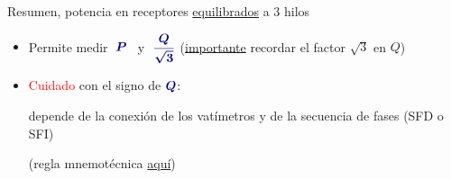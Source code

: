 \documentclass[aspectratio=169, usenames,svgnames,dvipsnames]{beamer}
\begin{document}
\begin{frame}{Resumen, \hspace{3mm}potencia en receptores \underline{equilibrados} a 3 hilos}

    \vspace{3mm}


    \begin{adjustwidth}{0.5cm}{} %
    \begin{itemize}
        \normalsize

        \item Permite medir $\; {\boldsymbol{\color{blue!50!black} P}} \;\,$ y $\; {\boldsymbol{\color{blue!50!black} \dfrac{Q}{\sqrt3}}}$ \hspace{3mm}(\underline{importante} recordar el factor $\sqrt3$ en $Q$)

        \vspace{3mm}
        \item \textcolor{red}{Cuidado} con el \alert{signo} de ${\boldsymbol{\color{blue!50!black} Q}}$\hspace{0.2mm}:

        \vspace{1mm}
        depende de la \alert{conexión} de los vatímetros y de la \alert{secuencia de fases} (SFD o SFI)

        \vspace{1mm}
        (regla mnemotécnica \hyperlink{diapo:2vat_reglaMnemotecnica}{aquí})
    \end{itemize}
    \end{adjustwidth}

    \vspace{2mm}
    
\end{frame}
\end{document}

